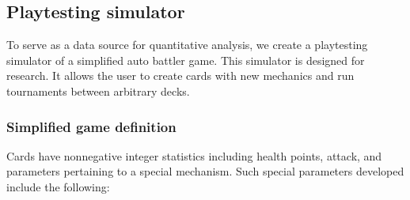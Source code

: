 
\subsection{Playtesting simulator}

To serve as a data source for quantitative analysis, we create
a playtesting simulator of a simplified auto battler game. 
This simulator is designed for research. It allows the user to 
create cards with new mechanics and run tournaments between
arbitrary decks. 

\subsubsection{Simplified game definition} \label{sec:ab-game-def}

Cards have nonnegative integer statistics including health points, 
attack, and parameters pertaining to a special mechanism. Such special parameters
developed include the following:

